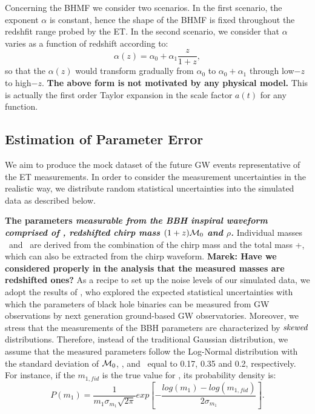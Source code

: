 \documentclass[twocolumn]{aastex62}
\newcommand{\kai}[1]{\textcolor{red}{[{\bf Kai}: #1]}}
\begin{document}
Concerning the BHMF we consider two scenarios. In the first scenario, the exponent $\alpha$ is constant, hence the shape of the BHMF is fixed throughout the redshfit range probed by the ET. In the second scenario, we consider that $\alpha$ varies as a function of redshift according to:
 \begin{equation} \label{equ_alphaz}
\alpha(z) = \alpha_0 + \alpha_1\frac{z}{1+z} , 
 \end{equation}
so that the $\alpha(z)$ would transform gradually from $\alpha_0$ to $\alpha_0+\alpha_1$ through low$-z$ to high$-z$. \textbf{The above form is not motivated by any physical model.}
This is actually the first order Taylor expansion in the scale factor $a(t)$ for any function.

\subsection{Estimation of Parameter Error} \label{sec_noiselevel}
We aim to produce the mock dataset of the future GW events representative of the ET  measurements. In order to consider the measurement uncertainties in the realistic way, we distribute random statistical uncertainties into the simulated data as described below.

\textbf{The parameters \it{measurable} from the BBH inspiral waveform comprised of \dl, redshifted chirp mass $(1+z){\cal M}_0 $ and $\rho$.} Individual masses \mone\ and \mtwo\ are derived from the combination of the chirp mass and the total mass \mone+\mtwo, which can also be extracted from the chirp waveform. 
\textbf{Marek: Have we considered properly in the analysis that the measured masses are redshifted ones?}
As a recipe to set up the noise levels of our simulated data, we adopt the results of \citet{Ghosh2016}, who  explored the expected statistical uncertainties with which the parameters of black hole binaries can be measured from GW observations by next generation ground-based GW observatories. 
Moreover, we stress that the measurements of the BBH parameters are characterized by ${\it skewed}$ distributions. Therefore, instead of the traditional Gaussian distribution, we assume that the measured parameters follow the Log-Normal distribution with the standard deviation of  ${\cal M}_0$, \dl, and \mone\ equal to 0.17, 0.35 and 0.2, respectively. For instance, if the $m_{1,fid}$ is the true value for \mone, its probability density is:
 \begin{equation} \label{equ_lognorm}
P(m_1) = \frac{1}{m_1 \sigma_{m_1} \sqrt{2\pi}} exp \left[- \frac{log(m_1)-log(m_{1,fid})}{2\sigma_{m_1}} \right].
 \end{equation}
 
\end{document}
